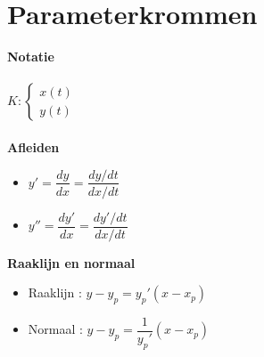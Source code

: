 \documentclass[12pt]{report}
\newcommand{\important}[1] {\textbf{\color{orange}#1}}
\begin{document}
\chapter{Parameterkrommen}
\important{Notatie}
\\
\\
$ K: 
 \begin{cases}
  x(t) \\
  y(t)
 \end{cases}
$
\\
\\
\important{Afleiden}
\begin{itemize}
 \item $y' = \dfrac{dy}{dx} = \dfrac{dy/dt}{dx/dt}$
 \item $y'' = \dfrac{dy'}{dx} = \dfrac{dy'/dt}{dx/dt}$
\end{itemize}
\important{Raaklijn en normaal}
\begin{itemize}
 \item Raaklijn : $y-y_p = y_p'(x - x_p)$
 \item Normaal  : $y-y_p = \dfrac{1}{y_p'}(x - x_p)$ 
\end{itemize}
\end{document}
